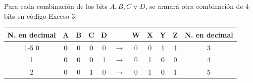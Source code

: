 \noindent{} Para cada combinación de los bits $A,B,C\text{ y }D$, se armará otra combinación de 4 bits en código Exceso-3:
\begin{center}
\begin{tabular}{c|cccc|l|cccc|c}
\cellcolor[HTML]{FFFC9E}N. en decimal & \cellcolor[HTML]{FFFC9E}A & \cellcolor[HTML]{FFFC9E}B & \cellcolor[HTML]{FFFC9E}C & \cellcolor[HTML]{FFFC9E}D &               & \cellcolor[HTML]{FFCCC9}W & \cellcolor[HTML]{FFCCC9}X & \cellcolor[HTML]{FFCCC9}Y & \cellcolor[HTML]{FFCCC9}Z & \cellcolor[HTML]{FFCCC9}N. en decimal \\ \cline{1-5} \cline{7-11} 
0                                     & 0                         & 0                         & 0                         & 0                         & $\rightarrow$ & 0                         & 0                         & 1                         & 1                         & 3                                     \\
1                                     & 0                         & 0                         & 0                         & 1                         & $\rightarrow$ & 0                         & 1                         & 0                         & 0                         & 4                                     \\
2                                     & 0                         & 0                         & 1                         & 0                         & $\rightarrow$ & 0                         & 1                         & 0                         & 1                         & 5                                    
\end{tabular}
\end{center}


